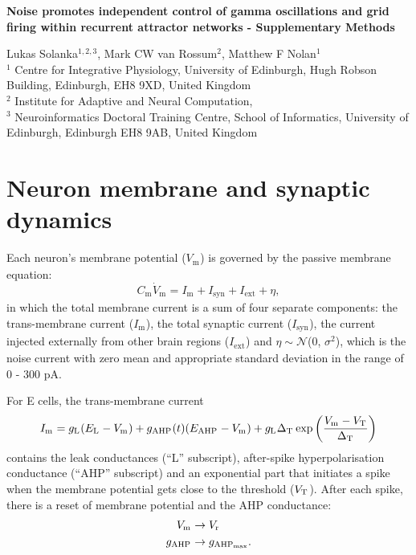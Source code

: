 \documentclass[a4paper,12pt]{article}
\newcommand{\ssc}[3]{\ensuremath{#1_{\text{#2}_{\text{#3}}}}}
\newcommand{\Cm}       {\ssc{C}      {m}     {}}
\newcommand{\Vm}       {\ssc{V}      {m}     {}}
\newcommand{\Imem}     {\ssc{I}      {m}     {}}
\newcommand{\Isyn}     {\ssc{I}      {syn}   {}}
\newcommand{\Iext}     {\ssc{I}      {ext}   {}}
\newcommand{\gL}       {\ssc{g}      {\scriptsize{L}}  {}}
\newcommand{\EL}       {\ssc{E}      {\scriptsize{L}}  {}}
\newcommand{\gAHP}     {\ssc{g}      {\scriptsize{AHP}}{}}
\newcommand{\gAHPmax}  {\ssc{g}      {\scriptsize{AHP}}{max}}
\newcommand{\EAHP}     {\ssc{E}      {\scriptsize{AHP}}{}}
\newcommand{\VT}       {\ssc{V}      {\scriptsize{T}}  {}}
\newcommand{\Vr}       {\ssc{V}      {r}     {}}
\newcommand{\deltaT}   {\ssc{\Delta} {\scriptsize{T}}{}}
\newcommand{\dVm}    {\ssc{\dot{V}}{m}   {}}
\begin{document}
\renewcommand\linenumberfont{\normalfont\small}
\linenumbers

\begin{center}
\large{{\bfseries
Noise promotes independent control of gamma oscillations and grid firing within
recurrent attractor networks - Supplementary Methods
}}
\end{center}

\begin{flushleft}
Lukas Solanka$^{1,2,3}$,
Mark CW van Rossum$^{2}$,
Matthew F Nolan$^{1}$
\\
\vspace{2em}
$^1$
Centre for Integrative Physiology,
University of Edinburgh,
Hugh Robson Building,
Edinburgh, EH8 9XD,
United Kingdom
\\
$^2$
Institute for Adaptive and Neural Computation,
\\
$^3$
Neuroinformatics Doctoral Training Centre,
School of Informatics,
University of Edinburgh,
Edinburgh EH8 9AB,
United Kingdom
\end{flushleft}

\listoftodos

\clearpage


\section{Neuron membrane and synaptic dynamics} \label{nrn_Vm_syn}

Each neuron's membrane potential ($\Vm$) is governed by the passive membrane equation:
\begin{equation}
    \Cm \dVm   = \Imem + \Isyn + \Iext + \eta,
    \label{eq:Vm}
\end{equation}
in which the total membrane current is a sum of four separate components: the
trans-membrane current ($\Imem$), the total synaptic current ($\Isyn$), the
current injected externally from other brain regions ($\Iext$) and $\eta \sim
\mathcal{N}$(0, $\sigma^2$), which is the noise current with zero mean and
appropriate standard deviation in the range of 0 - 300 pA. 

For E cells, the trans-membrane current
\begin{equation}
    \Imem = \gL(\EL-\Vm) + \gAHP(t)(\EAHP - \Vm) + \gL \deltaT \exp\left(\frac{\Vm - \VT}{\deltaT}\right)
    \label{eq:Imem_st}
\end{equation}
contains the leak conductances (``L'' subscript), after-spike hyperpolarisation
conductance (``AHP'' subscript) and an exponential part that initiates a spike
when the membrane potential gets close to the threshold ($\VT$).  After each
spike, there is a reset of membrane potential and the AHP conductance:
\begin{align}
    \Vm   & \rightarrow \Vr       \notag \\
    \gAHP & \rightarrow \gAHPmax.
    \label{eq:afterspike_st}
\end{align}
\end{document}

